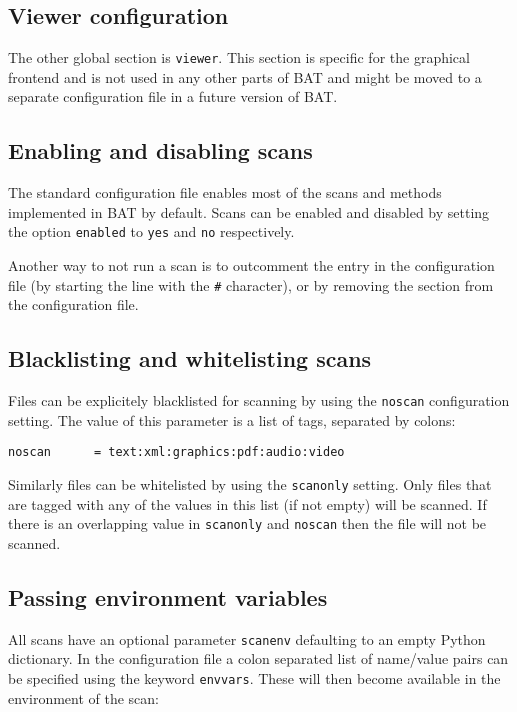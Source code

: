 \documentclass[10pt,a4paper]{article}
\begin{document}
\subsection{Viewer configuration}

The other global section is \texttt{viewer}. This section is specific for the
graphical frontend and is not used in any other parts of BAT and might be moved
to a separate configuration file in a future version of BAT.

\subsection{Enabling and disabling scans}

The standard configuration file enables most of the scans and methods
implemented in BAT by default. Scans can be enabled and disabled by setting the
option \texttt{enabled} to \texttt{yes} and \texttt{no} respectively.

Another way to not run a scan is to outcomment the entry in the configuration
file (by starting the line with the \texttt{\#} character), or by removing the
section from the configuration file.

\subsection{Blacklisting and whitelisting scans}

Files can be explicitely blacklisted for scanning by using the \texttt{noscan}
configuration setting. The value of this parameter is a list of tags, separated
by colons:

\begin{verbatim}
noscan      = text:xml:graphics:pdf:audio:video
\end{verbatim}

Similarly files can be whitelisted by using the \texttt{scanonly} setting. Only
files that are tagged with any of the values in this list (if not empty) will
be scanned. If there is an overlapping value in \texttt{scanonly} and
\texttt{noscan} then the file will not be scanned.

\subsection{Passing environment variables}

All scans have an optional parameter \texttt{scanenv} defaulting to an empty
Python dictionary. In the configuration file a colon separated list of
name/value pairs can be specified using the keyword \texttt{envvars}. These will
then become available in the environment of the scan:
\end{document}
